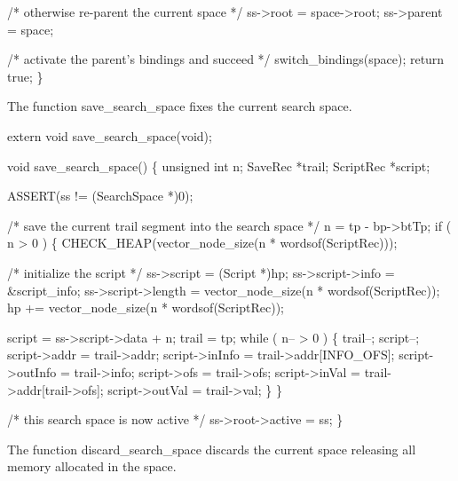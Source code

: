     /* otherwise re-parent the current space */
    ss->root   = space->root;
    ss->parent = space;

    /* activate the parent's bindings and succeed */
    switch_bindings(space);
    return true;
\}

\nwendcode{}\nwdocspar
The function {\Tt{}save{\_}search{\_}space\nwendquote} fixes the current search space.

\nwenddocs{}\plusendmoddef\nwstartdeflinemarkup{}\nwenddeflinemarkup
extern void save_search_space(void);

\nwendcode{}\nwdocspar
\nwenddocs{}\plusendmoddef\nwstartdeflinemarkup{}\nwenddeflinemarkup
void
save_search_space()
\{
    unsigned int n;
    SaveRec      *trail;
    ScriptRec    *script;

    ASSERT(ss != (SearchSpace *)0);

    /* save the current trail segment into the search space */
    n = tp - bp->btTp;
    if ( n > 0 )
    \{
        CHECK_HEAP(vector_node_size(n * wordsof(ScriptRec)));

        /* initialize the script */
        ss->script         = (Script *)hp;
        ss->script->info   = &script_info;
        ss->script->length = vector_node_size(n * wordsof(ScriptRec));
        hp                += vector_node_size(n * wordsof(ScriptRec));

        script = ss->script->data + n;
        trail  = tp;
        while ( n-- > 0 )
        \{
            trail--;
            script--;
            script->addr    = trail->addr;
            script->inInfo  = trail->addr[INFO_OFS];
            script->outInfo = trail->info;
            script->ofs     = trail->ofs;
            script->inVal   = trail->addr[trail->ofs];
            script->outVal  = trail->val;
        \}
    \}

    /* this search space is now active */
    ss->root->active = ss;
\}

\nwendcode{}\nwdocspar
The function {\Tt{}discard{\_}search{\_}space\nwendquote} discards the current space
releasing all memory allocated in the space.

